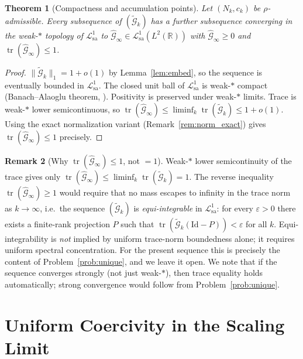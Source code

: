 \documentclass[12pt,a4paper]{amsart}
\newtheorem{theorem}{Theorem}[section]
\theoremstyle{definition}
\newtheorem{remark}[theorem]{Remark}
\newcommand{\norm}[1]{\|#1\|}
\newcommand{\Lcal}{\mathcal{L}^1_{\mathrm{sa}}}
\newcommand{\Gcal}{\widehat{\mathcal{G}}}
\begin{document}
\begin{theorem}[Compactness and accumulation points]
\label{thm:compact}
Let $(N_k,c_k)$ be $\rho$-admissible. Every subsequence of
$(\widetilde{\mathcal{G}}_k)$ has a further subsequence
converging in the weak-$*$ topology of $\Lcal$ to
$\Gcal_\infty\in\Lcal(L^2(\mathbb{R}))$ with
$\Gcal_\infty\geq0$ and $\operatorname{tr}(\Gcal_\infty)\leq1$.
\end{theorem}

\begin{proof}
$\norm{\widetilde{\mathcal{G}}_k}_1=1+o(1)$ by Lemma~\ref{lem:embed},
so the sequence is eventually bounded in $\Lcal$.
The closed unit ball of $\Lcal$ is weak-$*$ compact
(Banach--Alaoglu theorem, \cite[Thm.~III.17]{ReedSimon}).
Positivity is preserved under weak-$*$ limits.
Trace is weak-$*$ lower semicontinuous,
so $\operatorname{tr}(\Gcal_\infty)\leq
\liminf_k\operatorname{tr}(\widetilde{\mathcal{G}}_k)\leq1+o(1)$.
Using the exact normalization variant (Remark~\ref{rem:norm_exact})
gives $\operatorname{tr}(\Gcal_\infty)\leq1$ precisely.
\end{proof}

\begin{remark}[Why $\operatorname{tr}(\Gcal_\infty)\leq1$,
not $=1$]\label{rem:trace_eq}
Weak-$*$ lower semicontinuity of the trace gives only
$\operatorname{tr}(\Gcal_\infty)\leq\liminf_k
\operatorname{tr}(\widetilde{\mathcal{G}}_k)=1$.
The reverse inequality
$\operatorname{tr}(\Gcal_\infty)\geq1$ would require that
no mass escapes to infinity in the trace norm as $k\to\infty$,
i.e.\ the sequence $(\widetilde{\mathcal{G}}_k)$ is
\emph{equi-integrable} in $\Lcal$: for every $\varepsilon>0$
there exists a finite-rank projection $P$ such that
$\operatorname{tr}(\widetilde{\mathcal{G}}_k(\mathrm{Id}-P))
<\varepsilon$ for all $k$.
Equi-integrability is \emph{not} implied by uniform trace-norm
boundedness alone; it requires uniform spectral concentration.
For the present sequence this is precisely the content of
Problem~\ref{prob:unique}, and we leave it open.
We note that if the sequence converges strongly (not just
weak-$*$), then trace equality holds automatically;
strong convergence would follow from Problem~\ref{prob:unique}.
\end{remark}

\section{Uniform Coercivity in the Scaling Limit}\label{sec:coercivity}
\end{document}
